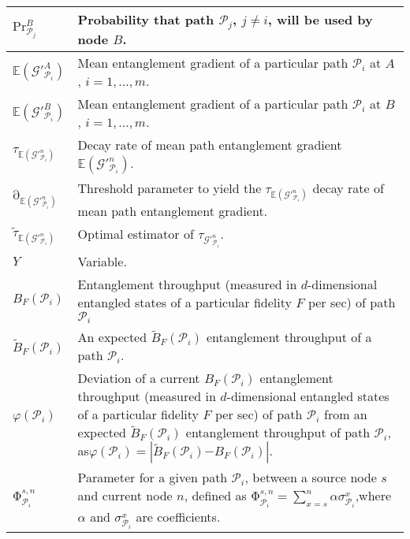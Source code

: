 \documentclass[11pt]{article}%
\begin{document}
\begin{longtable}{|p{1.6in}|p{2.8in}|}
$\mathrm{P}{\mathrm{r}}^B_{{\mathcal{P}}_j}$ & Probability that path ${\mathcal{P}}_j$, $j\mathrm{\ne }i$, will be used by node $B$. \\ \hline 
$\mathbb{E}\left({\mathcal{G}}'^A_{{\mathcal{P}}_i}\right)$ & Mean entanglement gradient of a particular path ${\mathcal{P}}_i$ at $A$, $i\mathrm{=1,\dots ,}m$. \\ \hline 
$\mathbb{E}\left({\mathcal{G}}'^B_{{\mathcal{P}}_i}\right)$ & Mean entanglement gradient of a particular path ${\mathcal{P}}_i$ at $B$, $i\mathrm{=1,\dots ,}m$. \\ \hline 
${\tau }_{\mathbb{E}\left({\mathcal{G}}'^n_{{\mathcal{P}}_i}\right)}$ & Decay rate of mean path entanglement gradient $\mathbb{E}\left({\mathcal{G}}'^n_{{\mathcal{P}}_i}\right)$. \\ \hline 
${\mathrm{\partial }}_{\mathbb{E}\left({\mathcal{G}}'^n_{{\mathcal{P}}_i}\right)}$ & Threshold parameter to yield the ${\tau }_{\mathbb{E}\left({\mathcal{G}}'^n_{{\mathcal{P}}_i}\right)}$ decay rate of mean path entanglement gradient. \\ \hline 
${\widetilde{\tau }}_{\mathbb{E}\left({\mathcal{G}}'^n_{{\mathcal{P}}_i}\right)}$ & Optimal estimator of ${\tau }_{{\mathcal{G}}'^n_{{\mathcal{P}}_i}}$. \\ \hline 
$Y$ & Variable. \\ \hline 
$B_F\left({\mathcal{P}}_i\right)$ & Entanglement throughput (measured in $d$-dimensional entangled states of a particular fidelity $F$ per sec) of path ${\mathcal{P}}_i$ \\ \hline 
${\tilde{B}}_F\left({\mathcal{P}}_i\right)$ & An expected ${\tilde{B}}_F\left({\mathcal{P}}_i\right)$ entanglement throughput of a path ${\mathcal{P}}_i$. \\ \hline 
$\varphi \left({\mathcal{P}}_i\right)$ & Deviation of a current $B_F\left({\mathcal{P}}_i\right)$ entanglement throughput (measured in $d$-dimensional entangled states of a particular fidelity $F$ per sec) of path ${\mathcal{P}}_i$ from an expected ${\tilde{B}}_F\left({\mathcal{P}}_i\right)$ entanglement throughput of path ${\mathcal{P}}_i$, as\newline $\varphi \left({\mathcal{P}}_i\right)\mathrm{=}\left|{\tilde{B}}_F\left({\mathcal{P}}_i\right)\mathrm{-}B_F\left({\mathcal{P}}_i\right)\right|$. \\ \hline 
${\mathrm{\Phi }}^{s,n}_{{\mathcal{P}}_i}$ & Parameter for a given path ${\mathcal{P}}_i$, between a source node $s$ and current node $n$, defined as \newline ${\mathrm{\Phi }}^{s,n}_{{\mathcal{P}}_i}\mathrm{=}\sum^n_{x\mathrm{=}s}{\alpha {\sigma }^x_{{\mathcal{P}}_i}}$,\newline where $\alpha $ and ${\sigma }^x_{{\mathcal{P}}_i}$ are coefficients. \\ \hline 

\end{longtable}
\end{document}
